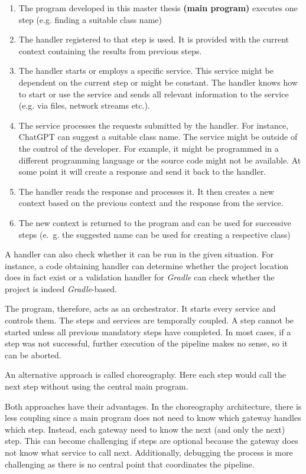 \begin{enumerate}
    \item The program developed in this master thesis \textbf{(main program)} executes one step (e.g. finding a suitable class name)
    \item The handler registered to that step is used. It is provided with the current context containing the results from previous steps.
    \item The handler starts or employs a specific service. This service might be dependent on the current step or might be constant. The handler knows how to start or use the service and sends all relevant information to the service (e.g. via files, network streams etc.). 
    \item The service processes the requests submitted by the handler. For instance, ChatGPT can suggest a suitable class name. The service might be outside of the control of the developer. For example, it might be programmed in a different programming language or the source code might not be available. At some point it will create a response and send it back to the handler. 
    \item The handler reads the response and processes it. It then creates a new context based on the previous context and the response from the service. 
    \item The new context is returned to the program and can be used for successive steps (e.~g. the suggested name can be used for creating a respective class) 
\end{enumerate}



A handler can also check whether it can be run in the given situation. For instance, a code obtaining handler can determine whether the project location does in fact exist or a validation handler for \textit{Gradle} can check whether the project is indeed \textit{Gradle}-based.

The program, therefore, acts as an orchestrator. It starts every service and controls them. The steps and services are temporally coupled. A step cannot be started unless all previous mandatory steps have completed. In most cases, if a step was not successful, further execution of the pipeline makes no sense, so it can be aborted. 

An alternative approach is called choreography. Here each step would call the next step without using the central main program. 

Both approaches have their advantages. In the choreography architecture, there is less coupling since a main program does not need to know which gateway handles which step. Instead, each gateway need to know the next (and only the next) step. This can become challenging if steps are optional because the gateway does not know what service to call next. Additionally, debugging the process is more challenging as there is no central point that coordinates the pipeline.

